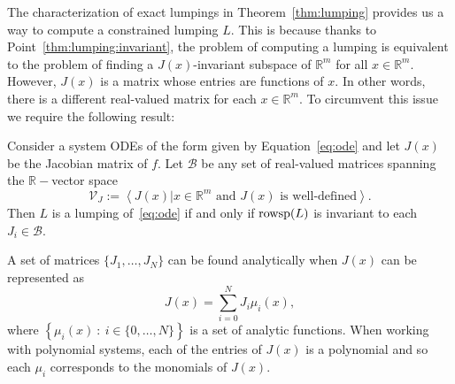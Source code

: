 The characterization of exact lumpings in Theorem~\ref{thm:lumping} provides us a way to compute a constrained lumping $L$.
This is because thanks to Point~\ref{thm:lumping:invariant}, the problem of computing a lumping is equivalent to the problem of finding a $J(x)$-invariant subspace of $\mathbb{R}^{m}$ for all $x \in \mathbb{R}^{m}$.
However, $J(x)$ is a matrix whose entries are functions of $x$.
In other words, there is a different real-valued matrix for each $x \in \mathbb{R}^{m}$.
To circumvent this issue we require the following result:

\begin{theorem}\label{thm:repJ}
	Consider a system ODEs of the form given by Equation~\eqref{eq:ode} and let $J(x)$ be the Jacobian matrix of $f$.
	Let $\mathcal{B}$ be any set of real-valued matrices spanning the $\mathbb{R}-$vector space $$\mathcal{V}_{J}:=\left< J(x) | x \in \mathbb{R}^{m} \text{ and $J(x)$ is well-defined}\right>.$$
	Then $L$ is a lumping of~\eqref{eq:ode} if and only if $\operatorname*{rowsp}(L)$ is invariant to each $J_i \in \mathcal{B}$.
\end{theorem}

A set of matrices $\{J_1,\dots, J_N\}$ can be found analytically when $J(x)$ can be represented as
\begin{equation}\label{eq:jacrep}
	J(x) = \sum_{i=0}^{N}J_{i}\mu_{i}(x),
\end{equation}
where $\left\{\mu_{i}(x)\ :\ i\in\{0,\ldots,N\}\right\}$ is a set of analytic functions.
When working with polynomial systems, each of the entries of $J(x)$ is a polynomial and so each $\mu_i$ corresponds to the monomials of $J(x)$.

